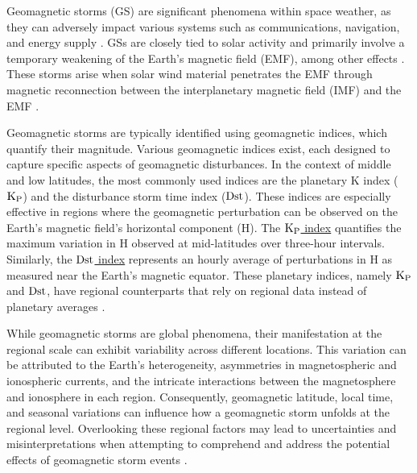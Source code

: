 \documentclass[a4paper,fleqn]{cas-dc}
\begin{document}
Geomagnetic storms (GS) are significant phenomena within space weather, as they can adversely impact various systems such as communications, navigation, and energy supply \citep{schrijver2015}. GSs are closely tied to solar activity and primarily involve a temporary weakening of the Earth's magnetic field (EMF), among other effects \citep{gonzalestgm}. These storms arise when solar wind material penetrates the EMF through magnetic reconnection between the interplanetary magnetic field (IMF) and the EMF \cite{l_basic_spaceplasmaphysic, l_russell}.

Geomagnetic storms are typically identified using geomagnetic indices, which quantify their magnitude. Various geomagnetic indices exist, each designed to capture specific aspects of geomagnetic disturbances. In the context of middle and low latitudes, the most commonly used indices are the planetary K index (${\rm K_P}$) and the disturbance storm time index (${\rm Dst}$). These indices are especially effective in regions where the geomagnetic perturbation can be observed on the Earth's magnetic field's horizontal component (H). The \href{https://www.gfz-potsdam.de/en/section/geomagnetism/data-products-services/geomagnetic-kp-index}{${\rm K_P}$ index} quantifies the maximum variation in H observed at mid-latitudes over three-hour intervals. Similarly, the \href{https://wdc.kugi.kyoto-u.ac.jp/dstae/index.html}{${\rm Dst}$ index} represents an hourly average of perturbations in H as measured near the Earth's magnetic equator. These planetary indices, namely ${\rm K_P}$ and ${\rm Dst}$, have regional counterparts that rely on regional data instead of planetary averages \citep{mayaud1980}.


While geomagnetic storms are global phenomena, their manifestation at the regional scale can exhibit variability across different locations. This variation can be attributed to the Earth's heterogeneity, asymmetries in magnetospheric and ionospheric currents, and the intricate interactions between the magnetosphere and ionosphere in each region. Consequently, geomagnetic latitude, local time, and seasonal variations can influence how a geomagnetic storm unfolds at the regional level. Overlooking these regional factors may lead to uncertainties and misinterpretations when attempting to comprehend and address the potential effects of geomagnetic storm events \citep{gic_intro, gic, gic_2, gic_brazil}.
\end{document}
